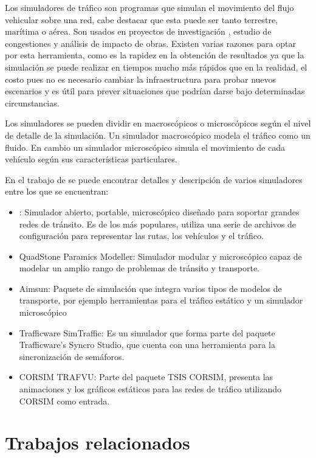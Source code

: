 Los simuladores de tráfico son programas que simulan el movimiento del flujo vehicular sobre una red, cabe destacar que esta puede ser tanto terrestre, marítima o aérea. Son usados en proyectos de investigación , estudio de congestiones y análisis de impacto de obras.  Existen varias razones para optar por esta herramienta, como es la rapidez en la obtención de resultados ya que la simulación se puede realizar en tiempos mucho más rápidos que en la realidad, el costo pues no es necesario cambiar la infraestructura para probar nuevos escenarios y es útil para prever situaciones que podrían darse bajo determinadas circunstancias.

Los simuladores se pueden dividir en macroscópicos o microscópicos según el nivel de detalle de la simulación. Un simulador macroscópico modela  el tráfico como un fluido. En cambio un simulador microscópico simula el movimiento de cada vehículo según sus características particulares.

En el trabajo de \citet{review_trafico} se puede encontrar detalles y descripción de varios simuladores entre los que se encuentran:
\begin{itemize}
	\item \citep{SUMO}: Simulador abierto, portable, microscópico diseñado para soportar grandes redes de tránsito. Es de los más populares, utiliza una serie de archivos de configuración para representar las rutas, los vehículos y el tráfico.
	\item QuadStone Paramics Modeller: Simulador modular y microscópico capaz de modelar un amplio rango de problemas de tránsito y transporte.
	\item Aimsun: Paquete de simulación que integra varios tipos de modelos de transporte, por ejemplo herramientas para el tráfico estático y un simulador microscópico
	\item Trafficware SimTraffic: Es un simulador que forma parte del paquete Trafficware's Syncro Studio, que cuenta con una herramienta para la sincronización de semáforos.
	\item CORSIM TRAFVU: Parte del paquete TSIS CORSIM, presenta las animaciones y los gráficos estáticos para las redes de tráfico utilizando CORSIM como entrada.
\end{itemize}


\section{Trabajos relacionados}

